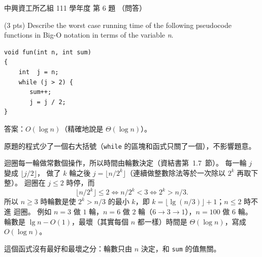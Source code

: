\begin{pastexam}[label={px:nchu-111-is-06}]{中興資工所乙組 111 學年度 第 6 題}
（問答）

(3 pts) Describe the worst case running time of the following pseudocode functions in Big-O notation in terms
of the variable \textit{n}.
\begin{verbatim}
void fun(int n, int sum)
{
    int  j = n;
    while (j > 2) {
       sum++;
       j = j / 2;
}
\end{verbatim}
\end{pastexam}

\begin{pastsoln}
答案：$O(\log n)$（精確地說是 $\Theta(\log n)$）。

原題的程式少了一個右大括號（\texttt{while} 的區塊和函式只關了一個），不影響題意。

迴圈每一輪做常數個操作，所以時間由輪數決定（資結書第~1.7~節）。 每一輪 $j$ 變成 $\lfloor j/2 \rfloor$，
做了 $k$ 輪之後 $j = \lfloor n / 2^k \rfloor$（連續做整數除法等於一次除以 $2^k$ 再取下整）。 迴圈在
$j \le 2$ 時停，而
\[
\lfloor n/2^k \rfloor \le 2 \iff n/2^k < 3 \iff 2^k > n/3 .
\]
所以 $n \ge 3$ 時輪數是使 $2^k > n/3$ 的最小 $k$，即 $k = \lfloor \lg(n/3) \rfloor + 1$；$n \le 2$ 時不進
迴圈。 例如 $n = 3$ 做 $1$ 輪，$n = 6$ 做 $2$ 輪（$6 \to 3 \to 1$），$n = 100$ 做 $6$ 輪。 輪數是
$\lg n - O(1)$，最壞（其實每個 $n$ 都一樣）時間是 $\Theta(\log n)$，寫成 $O(\log n)$。

這個函式沒有最好和最壞之分：輪數只由 $n$ 決定，和 \texttt{sum} 的值無關。
\end{pastsoln}
